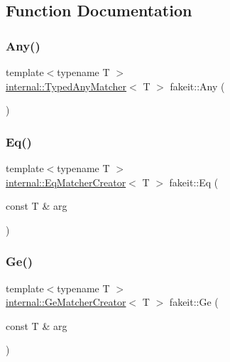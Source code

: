 \subsection{Function Documentation}
\mbox{\label{namespacefakeit_a90c2af0f730a82d62e89e84466d60aac}} 
\subsubsection{\texorpdfstring{Any()}{Any()}}
{\footnotesize\ttfamily template$<$typename T $>$ \\
\mbox{\hyperlink{structfakeit_1_1internal_1_1TypedAnyMatcher}{internal\+::\+Typed\+Any\+Matcher}}$<$ T $>$ fakeit\+::\+Any (\begin{DoxyParamCaption}{ }\end{DoxyParamCaption})}

\mbox{\label{namespacefakeit_aee3892f58c0ed1c1d4aa7575c95d52c7}} 
\subsubsection{\texorpdfstring{Eq()}{Eq()}}
{\footnotesize\ttfamily template$<$typename T $>$ \\
\mbox{\hyperlink{structfakeit_1_1internal_1_1EqMatcherCreator}{internal\+::\+Eq\+Matcher\+Creator}}$<$ T $>$ fakeit\+::\+Eq (\begin{DoxyParamCaption}\item[{const T \&}]{arg }\end{DoxyParamCaption})}

\mbox{\label{namespacefakeit_a6381d1f6760ba2b021457f6db4f4a219}} 
\subsubsection{\texorpdfstring{Ge()}{Ge()}}
{\footnotesize\ttfamily template$<$typename T $>$ \\
\mbox{\hyperlink{structfakeit_1_1internal_1_1GeMatcherCreator}{internal\+::\+Ge\+Matcher\+Creator}}$<$ T $>$ fakeit\+::\+Ge (\begin{DoxyParamCaption}\item[{const T \&}]{arg }\end{DoxyParamCaption})}

